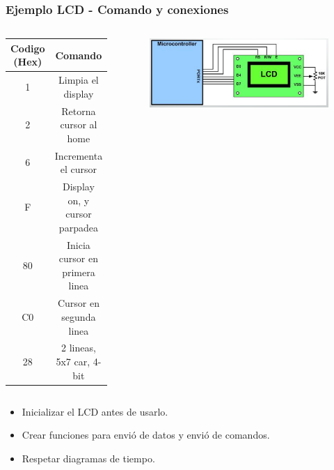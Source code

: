 \documentclass[10.5pt,scale=1.0,t,aspectratio=169,hyperref={pdfpagelabels=false}]{beamer}
\begin{document}
\begin{frame}
	\frametitle{Ejemplo LCD - Comando y conexiones}
	\begin{columns}
		\begin{small}
			\begin{center}
				\begin{tabular}{ c c  }
					\hline
					\textbf{Codigo (Hex)} & \textbf{Comando}   \\ 
					\hline
					1 & Limpia el display  \\  
					2 & Retorna cursor al home \\
					6 & Incrementa el cursor \\
					F & Display on, y cursor parpadea \\
					80 & Inicia cursor en primera linea \\
					C0 & Cursor en segunda linea\\
					28 & 2 lineas, 5x7 car, 4-bit \\
					\hline  
				\end{tabular}
			\end{center}
		\end{small}

		\begin{figure}
			\centering
			\includegraphics[scale=0.37]{18_LCDConex}
		\end{figure}
	\end{columns}

	\begin{itemize}
		\item Inicializar el LCD antes de usarlo.
		\item Crear funciones para envió de datos y envió de comandos.
		\item Respetar diagramas de tiempo. 
	\end{itemize}
\end{frame}
\end{document}

